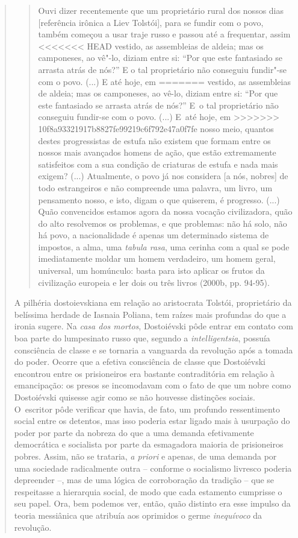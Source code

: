 {\begin{quote}
\begin{quote}
Ouvi dizer recentemente que um proprietário rural dos nossos dias
{[}referência irônica a Liev Tolstói{]}, para se fundir com o povo,
também começou a usar traje russo e passou até a frequentar, assim
<<<<<<< HEAD
vestido, as assembleias de aldeia; mas os camponeses, ao vê"-lo, diziam
entre si: ``Por que este fantasiado se arrasta atrás de nós?'' E o tal
proprietário não conseguiu fundir"-se com o povo. (...) E até hoje, em
=======
vestido, as assembleias de aldeia; mas os camponeses, ao vê-lo, diziam
entre si: ``Por que este fantasiado se arrasta atrás de nós?'' E~o tal
proprietário não conseguiu fundir-se com o povo. (...) E~até hoje, em
>>>>>>> 10f8a93321917b8827fe99219c6f792e47a0f7fe
nosso meio, quantos destes progressistas de estufa não existem que
formam entre os nossos mais avançados homens de ação, que estão
extremamente satisfeitos com a sua condição de criaturas de estufa e
nada mais exigem? (...) Atualmente, o povo já nos considera {[}a nós,
nobres{]} de todo estrangeiros e não compreende uma palavra, um livro,
um pensamento nosso, e isto, digam o que quiserem, é progresso. (...)
Quão convencidos estamos agora da nossa vocação civilizadora, quão do
alto resolvemos os problemas, e que problemas: não há solo, não há povo,
a nacionalidade é apenas um determinado sistema de impostos, a alma, uma
\emph{tabula rasa}, uma cerinha com a qual se pode imediatamente moldar
um homem verdadeiro, um homem geral, universal, um homúnculo: basta para
isto aplicar os frutos da civilização europeia e ler dois ou três livros
(2000b, pp. 94-95).
\end{quote}

A pilhéria dostoievskiana em relação ao aristocrata Tolstói,
proprietário da belíssima herdade de Iasnaia Poliana, tem raízes mais
profundas do que a ironia sugere. Na \emph{casa dos mortos}, Dostoiévski
pôde entrar em contato com boa parte do lumpesinato russo que, segundo a
\emph{intelligentsia}, possuía consciência de classe e se tornaria a
vanguarda da revolução após a tomada do poder. Ocorre que a efetiva
consciência de classe que Dostoiévski encontrou entre os prisioneiros
era bastante contraditória em relação à emancipação: os presos se
incomodavam com o fato de que um nobre como Dostoiévski quisesse agir
como se não houvesse distinções sociais. O~escritor pôde verificar que
havia, de fato, um profundo ressentimento social entre os detentos, mas
isso poderia estar ligado mais à usurpação do poder por parte da nobreza
do que a uma demanda efetivamente democrática e socialista por parte da
esmagadora maioria de prisioneiros pobres. Assim, não se trataria,
\emph{a priori} e apenas, de uma demanda por uma sociedade radicalmente
outra -- conforme o socialismo livresco poderia depreender --, mas de
uma lógica de corroboração da tradição -- que se respeitasse a
hierarquia social, de modo que cada estamento cumprisse o seu papel.
Ora, bem podemos ver, então, quão distinto era esse impulso da teoria
messiânica que atribuía aos oprimidos o germe \emph{inequívoco} da
revolução.


\end{quote}}
